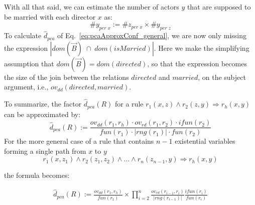 With all that said, we can estimate the number of actors $y$ that are supposed to be married with each director $x$ as:
$$
 \#y_{per\;x} :=  \#z_{per \; x} \times \#y_{ per \; z}
$$
\noindent To calculate $\widehat{d}_{pca}$ of Eq.~\ref{eq:pcaApproxConf_general}, we are now only missing
the expression $|dom(\vec{B})\;\cap\;dom(isMarried)|$.
Here we make the simplifying assumption that $dom(\vec{B}) = dom(directed)$, so that the expression
becomes the size of the join between the relations $directed$ and $married$, on the subject argument,
i.e., $ov_{dd}(directed,married)$.

To summarize, the factor $\widehat{d}_{pca}(R)$ for a rule $r_1(x,z)\wedge r_2(z,y) \Rightarrow r_h(x,y)$ can be approximated by:
\[
  \widehat{d}_{pca}(R) := \frac{ov_{dd}(r_1,r_h) \cdot ov_{rd}(r_1,r_2) \cdot ifun(r_2)  }{fun(r_1) \cdot |rng(r_1)| \cdot fun(r_2)}
\]
For the more general case of a rule that contains $n-1$ existential variables forming a single path from $x$ to $y$
$$
  r_1(x,z_1) \wedge r_2(z_1,z_2) \wedge ... \wedge r_n(z_{n-1},y) \Rightarrow r_h(x,y)
$$

\noindent the formula becomes:

\begin{eqnarray*}
  \widehat{d}_{pca}(R) := \frac{ov_{dd}(r_1,r_h)}{fun(r_1)}  \times
  \prod_{i=2}^{n}\frac{ov_{rd}(r_{i-1},r_i) }{|rng(r_{i-1})|}\frac{ifun(r_i)}{fun(r_i)}
\end{eqnarray*}





